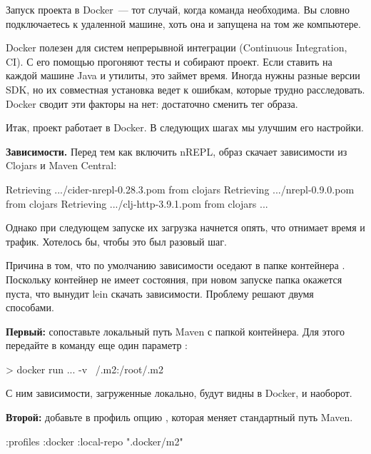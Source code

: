 Запуск проекта в Docker~--- тот случай, когда команда  необходима. Вы словно подключаетесь к удаленной машине, хоть она и запущена на том же компьютере.

Docker полезен для систем непрерывной интеграции (Continuous Integration, CI). С его помощью прогоняют тесты и собирают проект. Если ставить на каждой машине Java и утилиты, это займет время. Иногда нужны разные версии SDK, но их совместная установка ведет к ошибкам, которые трудно расследовать. Docker сводит эти факторы на нет: достаточно сменить тег образа.

Итак, проект работает в Docker. В следующих шагах мы улучшим его настройки.


\textbf{Зависимости.} Перед тем как включить nREPL, образ скачает зависимости из Clojars и Maven Central:

\begin{english}
  \begin{text}
Retrieving .../cider-nrepl-0.28.3.pom from clojars
Retrieving .../nrepl-0.9.0.pom from clojars
Retrieving .../clj-http-3.9.1.pom from clojars
...
  \end{text}
\end{english}

Однако при следующем запуске их загрузка начнется опять, что отнимает время и трафик. Хотелось бы, чтобы это был разовый шаг.

Причина в том, что по умолчанию зависимости оседают в папке контейнера . Поскольку контейнер не имеет состояния, при новом запуске папка окажется пуста, что вынудит lein скачать зависимости. Проблему решают двумя способами.

\textbf{Первый:} сопоставьте локальный путь Maven с папкой контейнера. Для этого передайте в команду  еще один параметр :

\begin{english}
  \begin{bash}
> docker run ... -v ~/.m2:/root/.m2
  \end{bash}
\end{english}

С ним зависимости, загруженные локально, будут видны в Docker, и наоборот.

\textbf{Второй:} добавьте в профиль  опцию , которая меняет стандартный путь Maven.

\begin{english}
  \begin{clojure}
{:profiles
 {:docker {:local-repo ".docker/m2"}}}
  \end{clojure}
\end{english}


